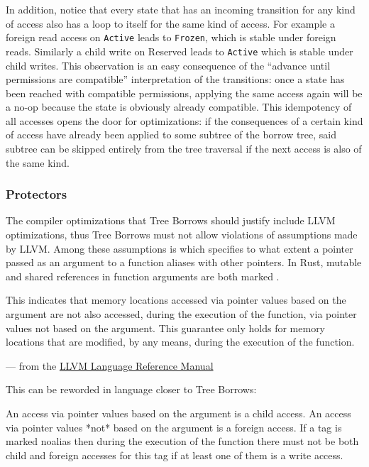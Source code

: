 \documentclass[a4paper,11pt]{article}
\theoremstyle{plain}
\theoremstyle{definition}
\theoremstyle{remark}
\newcommand{\tcode}[1]{\rstinline{#1}}
\newcommand{\tperm}[1]{\texttt{#1}}
\begin{document}
In addition, notice that every state that has an incoming transition for any kind of
access also has a loop to itself for the same kind of access. For example a foreign read
access on \tperm{Active} leads to \tperm{Frozen}, which is stable under foreign reads. Similarly
a child write on Reserved leads to \tperm{Active} which is stable under child writes.
This observation is an easy consequence of the ``advance until permissions are compatible''
interpretation of the transitions: once a state has been reached with compatible
permissions, applying the same access again will be a no-op because the state
is obviously already compatible. This idempotency of all accesses opens the door
for optimizations: if the consequences of a certain kind of access have already
been applied to some subtree of the borrow tree, said subtree can be skipped entirely
from the tree traversal if the next access is also of the same kind.


\subsubsection{Protectors}

The compiler optimizations that Tree Borrows should justify include LLVM optimizations,
thus Tree Borrows must not allow violations of assumptions made by LLVM. Among these
assumptions is \tcode{noalias} which specifies to what extent a pointer passed as an
argument to a function aliases with other pointers. In Rust, mutable and shared
references in function arguments are both marked \tcode{noalias}.

\begin{indent}
    \tcode{noalias}

    \begin{indent}
        This indicates that memory locations accessed via pointer values based on the argument
        are not also accessed, during the execution of the function, via pointer values not based on
        the argument. This guarantee only holds for memory locations that are modified,
        by any means, during the execution of the function.
    \end{indent}

    --- from the \href{https://llvm.org/docs/LangRef.html}{LLVM Language Reference Manual}
\end{indent}

This can be reworded in language closer to Tree Borrows:

\begin{indent}
An access via pointer values based on the argument is a child access.
An access via pointer values *not* based on the argument is a foreign access.
If a tag is marked noalias then during the execution of the function there must
not be both child and foreign accesses for this tag if at least one of them is a write access.
\end{indent}
\end{document}
